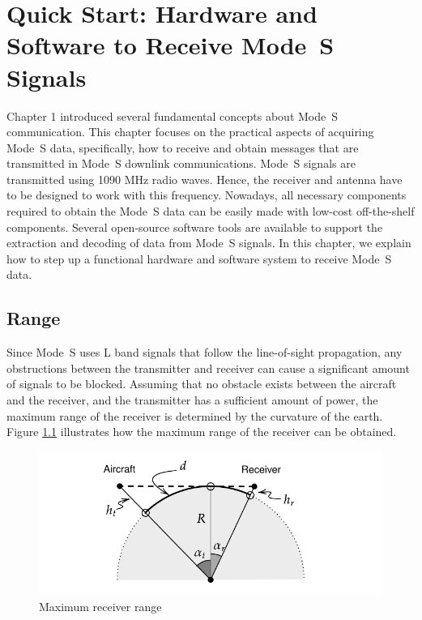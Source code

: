 \chapter{Quick Start: Hardware and Software to Receive Mode~S Signals}
\label{chap:quickstart}

Chapter 1 introduced several fundamental concepts about Mode~S communication. This chapter focuses on the practical aspects of acquiring Mode~S data, specifically, how to receive and obtain messages that are transmitted in Mode~S downlink communications. Mode~S signals are transmitted using 1090 MHz radio waves. Hence, the receiver and antenna have to be designed to work with this frequency. Nowadays, all necessary components required to obtain the Mode~S data can be easily made with low-cost off-the-shelf components. Several open-source software tools are available to support the extraction and decoding of data from Mode~S signals. In this chapter, we explain how to step up a functional hardware and software system to receive Mode~S data.

\section{Range}
Since Mode~S uses L band signals that follow the line-of-sight propagation, any obstructions between the transmitter and receiver can cause a significant amount of signals to be blocked. Assuming that no obstacle exists between the aircraft and the receiver, and the transmitter has a sufficient amount of power, the maximum range of the receiver is determined by the curvature of the earth. Figure \ref{fig:max_range} illustrates how the maximum range of the receiver can be obtained.

\begin{figure}[ht]
\centering
\includegraphics[scale=0.9]{figures/quickstart/max_range.pdf}
\caption{Maximum receiver range}
\label{fig:max_range}
\end{figure}


